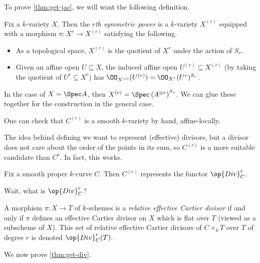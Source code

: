 \documentclass[../notes.tex]{subfiles}
\begin{document}
To prove \autoref{thm:get-jac}, we will want the following definition.
\begin{definition}
	Fix a $k$-variety $X$. Then the \textit{$r$th symmetric power} is a $k$-variety $X^{(r)}$ equipped with a morphism $\pi\colon X^r\to X^{(r)}$ satisfying the following.
	\begin{itemize}
		\item As a topological space, $X^{(r)}$ is the quotient of $X^r$ under the action of $S_r$.
		\item Given an affine open $U\subseteq X$, the induced affine open $U^{(r)}\subseteq X^{(r)}$ (by taking the quotient of $U^r\subseteq X^r$) has $\OO_{X^{(r)}}(U^{(r)})=\OO_{X^r}(U^r)^{S_r}$.
	\end{itemize}
\end{definition}
\begin{example}
	In the case of $X=\Spec A$, then $X^{(r)}=\Spec\left(A^{\otimes r}\right)^{S_r}$. We can glue these together for the construction in the general case.
\end{example}
\begin{remark}
	One can check that $C^{(r)}$ is a smooth $k$-variety by hand, affine-locally.
\end{remark}
The idea behind defining we want to represent (effective) divisors, but a divisor does not care about the order of the points in its sum, so $C^{(r)}$ is a more suitable candidate than $C^r$. In fact, this works.
\begin{theorem} \label{thm:get-div}
	Fix a smooth proper $k$-curve $C$. Then $C^{(r)}$ represents the functor $\op{Div}^r_C$.
\end{theorem}
Wait, what is $\op{Div}^r_C$?
\begin{definition}
	A morphism $\pi\colon X\to T$ of $k$-schemes is a \textit{relative effective Cartier divisor} if and only if $\pi$ defines an effective Cartier divisor on $X$ which is flat over $T$ (viewed as a subscheme of $X$). This set of relative effective Cartier divisors of $C\times_kT$ over $T$ of degree $r$ is denoted $\op{Div}^r_C(T)$.
\end{definition}
We now prove \autoref{thm:get-div}.
\end{document}
